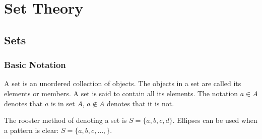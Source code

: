 \chapter{Set Theory}
\section{Sets}
\subsection{Basic Notation}
A set is an unordered collection of objects. The objects in a set are called its elements or members. A set is said to contain all its elements. The notation \(a \in A\) denotes that \(a\) is in set \(A\), \(a \notin A\) denotes that it is not.

The rooster method of denoting a set is \(S = \{a, b, c, d\}\). Ellipses can be used when a pattern is clear: \(S = \{a, b, c, \dots, \}\).

